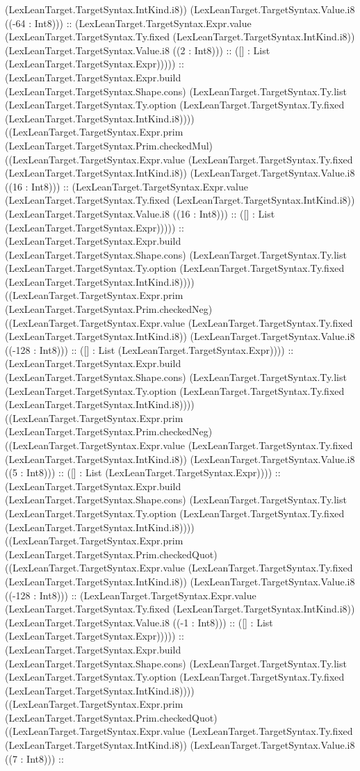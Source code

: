 \documentclass[11pt]{article}
\begin{document}
(LexLeanTarget.TargetSyntax.IntKind.i8)) (LexLeanTarget.TargetSyntax.Value.i8 ((-64 : Int8))) :: (LexLeanTarget.TargetSyntax.Expr.value (LexLeanTarget.TargetSyntax.Ty.fixed (LexLeanTarget.TargetSyntax.IntKind.i8)) (LexLeanTarget.TargetSyntax.Value.i8 ((2 : Int8))) :: ([] : List (LexLeanTarget.TargetSyntax.Expr))))) :: (LexLeanTarget.TargetSyntax.Expr.build (LexLeanTarget.TargetSyntax.Shape.cons) (LexLeanTarget.TargetSyntax.Ty.list (LexLeanTarget.TargetSyntax.Ty.option (LexLeanTarget.TargetSyntax.Ty.fixed (LexLeanTarget.TargetSyntax.IntKind.i8)))) ((LexLeanTarget.TargetSyntax.Expr.prim (LexLeanTarget.TargetSyntax.Prim.checkedMul) ((LexLeanTarget.TargetSyntax.Expr.value (LexLeanTarget.TargetSyntax.Ty.fixed (LexLeanTarget.TargetSyntax.IntKind.i8)) (LexLeanTarget.TargetSyntax.Value.i8 ((16 : Int8))) :: (LexLeanTarget.TargetSyntax.Expr.value (LexLeanTarget.TargetSyntax.Ty.fixed (LexLeanTarget.TargetSyntax.IntKind.i8)) (LexLeanTarget.TargetSyntax.Value.i8 ((16 : Int8))) :: ([] : List (LexLeanTarget.TargetSyntax.Expr))))) :: (LexLeanTarget.TargetSyntax.Expr.build (LexLeanTarget.TargetSyntax.Shape.cons) (LexLeanTarget.TargetSyntax.Ty.list (LexLeanTarget.TargetSyntax.Ty.option (LexLeanTarget.TargetSyntax.Ty.fixed (LexLeanTarget.TargetSyntax.IntKind.i8)))) ((LexLeanTarget.TargetSyntax.Expr.prim (LexLeanTarget.TargetSyntax.Prim.checkedNeg) ((LexLeanTarget.TargetSyntax.Expr.value (LexLeanTarget.TargetSyntax.Ty.fixed (LexLeanTarget.TargetSyntax.IntKind.i8)) (LexLeanTarget.TargetSyntax.Value.i8 ((-128 : Int8))) :: ([] : List (LexLeanTarget.TargetSyntax.Expr)))) :: (LexLeanTarget.TargetSyntax.Expr.build (LexLeanTarget.TargetSyntax.Shape.cons) (LexLeanTarget.TargetSyntax.Ty.list (LexLeanTarget.TargetSyntax.Ty.option (LexLeanTarget.TargetSyntax.Ty.fixed (LexLeanTarget.TargetSyntax.IntKind.i8)))) ((LexLeanTarget.TargetSyntax.Expr.prim (LexLeanTarget.TargetSyntax.Prim.checkedNeg) ((LexLeanTarget.TargetSyntax.Expr.value (LexLeanTarget.TargetSyntax.Ty.fixed (LexLeanTarget.TargetSyntax.IntKind.i8)) (LexLeanTarget.TargetSyntax.Value.i8 ((5 : Int8))) :: ([] : List (LexLeanTarget.TargetSyntax.Expr)))) :: (LexLeanTarget.TargetSyntax.Expr.build (LexLeanTarget.TargetSyntax.Shape.cons) (LexLeanTarget.TargetSyntax.Ty.list (LexLeanTarget.TargetSyntax.Ty.option (LexLeanTarget.TargetSyntax.Ty.fixed (LexLeanTarget.TargetSyntax.IntKind.i8)))) ((LexLeanTarget.TargetSyntax.Expr.prim (LexLeanTarget.TargetSyntax.Prim.checkedQuot) ((LexLeanTarget.TargetSyntax.Expr.value (LexLeanTarget.TargetSyntax.Ty.fixed (LexLeanTarget.TargetSyntax.IntKind.i8)) (LexLeanTarget.TargetSyntax.Value.i8 ((-128 : Int8))) :: (LexLeanTarget.TargetSyntax.Expr.value (LexLeanTarget.TargetSyntax.Ty.fixed (LexLeanTarget.TargetSyntax.IntKind.i8)) (LexLeanTarget.TargetSyntax.Value.i8 ((-1 : Int8))) :: ([] : List (LexLeanTarget.TargetSyntax.Expr))))) :: (LexLeanTarget.TargetSyntax.Expr.build (LexLeanTarget.TargetSyntax.Shape.cons) (LexLeanTarget.TargetSyntax.Ty.list (LexLeanTarget.TargetSyntax.Ty.option (LexLeanTarget.TargetSyntax.Ty.fixed (LexLeanTarget.TargetSyntax.IntKind.i8)))) ((LexLeanTarget.TargetSyntax.Expr.prim (LexLeanTarget.TargetSyntax.Prim.checkedQuot) ((LexLeanTarget.TargetSyntax.Expr.value (LexLeanTarget.TargetSyntax.Ty.fixed (LexLeanTarget.TargetSyntax.IntKind.i8)) (LexLeanTarget.TargetSyntax.Value.i8 ((7 : Int8))) :: 
\end{document}
